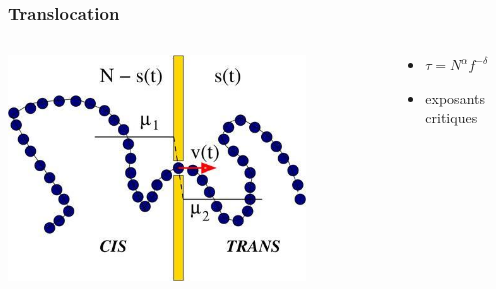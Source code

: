 \documentclass{beamer}
\begin{document}
\frame %
{
  \frametitle{Translocation}
 

\begin{columns}
 \begin{column}{0.8\textwidth}
\begin{center}
  \includegraphics[width=0.8\textwidth]{translocation.jpg} 
 \end{center}
\end{column}
\begin{column}{0.3\textwidth}

 \begin{center}
\begin{itemize}
\item<2->{ $\tau = N^\alpha f^{-\delta}$}
\medskip

\item<3->{ exposants critiques}
\end{itemize}


\end{center}
 
\end{column}
\end{columns}
}
\end{document}
